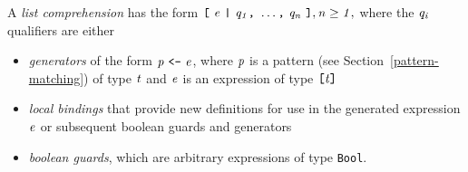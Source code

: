\noindent
A {\em list comprehension} has the form \mbox{$\it \makebox{\tt [}\ e\ \makebox{\tt |}\ q_1\makebox{\tt ,}\ \ldots \makebox{\tt ,}\ q_n\ \makebox{\tt ]},\\
\it n\geq 1,$} where the \mbox{$\it q_i$} qualifiers are either
\begin{itemize}
\item {\em generators} of the form \mbox{$\it p\ \makebox{\tt <-}\ e$}, where
\mbox{$\it p$} is a
pattern (see Section~\ref{pattern-matching}) of type \mbox{$\it t$} and \mbox{$\it e$} is an
expression of type \mbox{$\it \makebox{\tt [}t\makebox{\tt ]}$}
\item {\em local bindings} that provide new definitions for use in
the generated expression \mbox{$\it e$} or subsequent boolean guards and generators
\item {\em boolean guards}, which are arbitrary expressions of
type \mbox{\tt Bool}.
\end{itemize}

